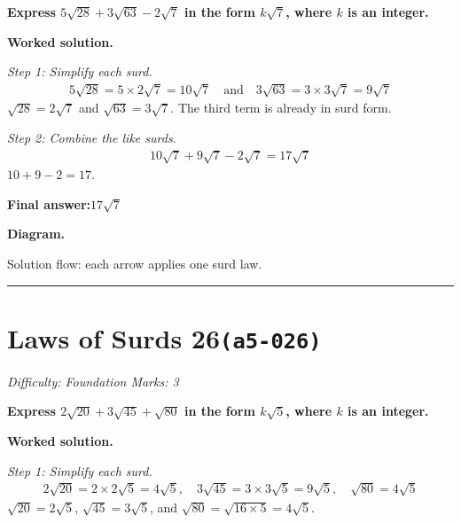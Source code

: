 \documentclass[11pt]{article}
\newcommand{\question}[1]{\par\medskip\noindent\textbf{#1}\par}
\begin{document}
\question{Express \( 5\sqrt{28} + 3\sqrt{63} - 2\sqrt{7} \) in the form \( k\sqrt{7} \), where \( k \) is an integer.}

\textbf{Worked solution.}

\textit{Step 1: Simplify each surd.}
\[\begin{gathered}
5\sqrt{28} = 5 \times 2\sqrt{7} = 10\sqrt{7} \quad \text{and} \quad 3\sqrt{63} = 3 \times 3\sqrt{7} = 9\sqrt{7}
\end{gathered}\]
\( \sqrt{28} = 2\sqrt{7} \) and \( \sqrt{63} = 3\sqrt{7} \). The third term is already in surd form.

\textit{Step 2: Combine the like surds.}
\[\begin{gathered}
10\sqrt{7} + 9\sqrt{7} - 2\sqrt{7} = 17\sqrt{7}
\end{gathered}\]
\( 10 + 9 - 2 = 17 \).

\begin{answerbox}
\textbf{Final answer:}\quad \(\displaystyle 17\sqrt{7}\)
\end{answerbox}
\textbf{Diagram.}

\begin{center}
\end{center}
\small Solution flow: each arrow applies one surd law.\normalsize

\medskip\hrule

\section*{Laws of Surds 26\quad\small\texttt{(a5-026)}}
\textit{Difficulty: Foundation \quad\textbar\quad Marks: 3}

\question{Express \( 2\sqrt{20} + 3\sqrt{45} + \sqrt{80} \) in the form \( k\sqrt{5} \), where \( k \) is an integer.}

\textbf{Worked solution.}

\textit{Step 1: Simplify each surd.}
\[\begin{gathered}
2\sqrt{20} = 2 \times 2\sqrt{5} = 4\sqrt{5}, \quad 3\sqrt{45} = 3 \times 3\sqrt{5} = 9\sqrt{5}, \quad \sqrt{80} = 4\sqrt{5}
\end{gathered}\]
\( \sqrt{20} = 2\sqrt{5} \), \( \sqrt{45} = 3\sqrt{5} \), and \( \sqrt{80} = \sqrt{16 \times 5} = 4\sqrt{5} \).
\end{document}
